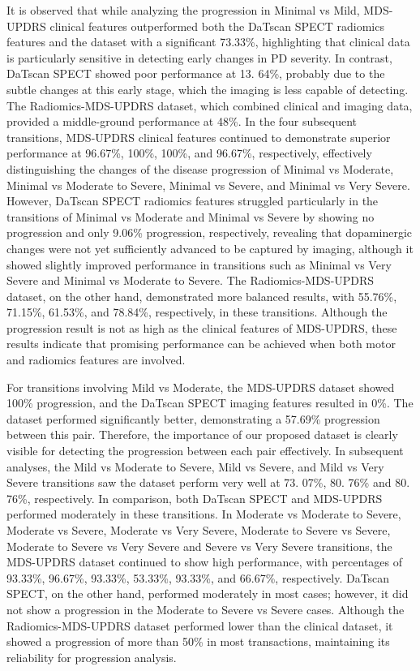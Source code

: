 \documentclass[twocolumn]{article}
\begin{document}
It is observed that while analyzing the progression in Minimal vs Mild, MDS-UPDRS clinical features outperformed both the DaTscan SPECT radiomics features and the dataset with a significant 73.33\%, highlighting that clinical data is particularly sensitive in detecting early changes in PD severity. In contrast, DaTscan SPECT showed poor performance at 13. 64\%, probably due to the subtle changes at this early stage, which the imaging is less capable of detecting. The Radiomics-MDS-UPDRS dataset, which combined clinical and imaging data, provided a middle-ground performance at 48\%. In the four subsequent transitions, MDS-UPDRS clinical features continued to demonstrate superior performance at 96.67\%, 100\%, 100\%, and 96.67\%, respectively, effectively distinguishing the changes of the disease progression of Minimal vs Moderate, Minimal vs Moderate to Severe, Minimal vs Severe, and Minimal vs Very Severe. However, DaTscan SPECT radiomics features struggled particularly in the transitions of Minimal vs Moderate and Minimal vs Severe by showing no progression and only 9.06\% progression, respectively, revealing that dopaminergic changes were not yet sufficiently advanced to be captured by imaging, although it showed slightly improved performance in transitions such as Minimal vs Very Severe and Minimal vs Moderate to Severe. The Radiomics-MDS-UPDRS dataset, on the other hand, demonstrated more balanced results, with 55.76\%, 71.15\%, 61.53\%, and 78.84\%, respectively, in these transitions. Although the progression result is not as high as the clinical features of MDS-UPDRS, these results indicate that promising performance can be achieved when both motor and radiomics features are involved.

For transitions involving Mild vs Moderate, the MDS-UPDRS dataset showed 100\% progression, and the DaTscan SPECT imaging features resulted in 0\%. The dataset performed significantly better, demonstrating a 57.69\% progression between this pair. Therefore, the importance of our proposed dataset is clearly visible for detecting the progression between each pair effectively. In subsequent analyses, the Mild vs Moderate to Severe, Mild vs Severe, and Mild vs Very Severe transitions saw the dataset perform very well at 73. 07\%, 80. 76\% and 80. 76\%, respectively. In comparison, both DaTscan SPECT and MDS-UPDRS performed moderately in these transitions. In Moderate vs Moderate to Severe, Moderate vs Severe, Moderate vs Very Severe, Moderate to Severe vs Severe, Moderate to Severe vs Very Severe and Severe vs Very Severe transitions, the MDS-UPDRS dataset continued to show high performance, with percentages of 93.33\%, 96.67\%, 93.33\%, 53.33\%, 93.33\%, and 66.67\%, respectively. DaTscan SPECT, on the other hand, performed moderately in most cases; however, it did not show a progression in the Moderate to Severe vs Severe cases. Although the Radiomics-MDS-UPDRS dataset performed lower than the clinical dataset, it showed a progression of more than 50\% in most transactions, maintaining its reliability for progression analysis.
\end{document}
